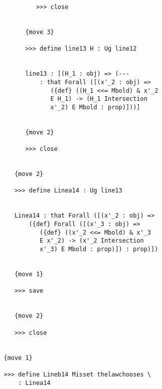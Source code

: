 \documentclass[12pt]{article}
\begin{document}
\begin{verbatim}
            >>> close


         {move 3}

         >>> define line13 H : Ug line12


         line13 : [(H_1 : obj) => (--- 
             : that Forall ([(x'_2 : obj) => 
                ({def} ((H_1 <<= Mbold) & x'_2 
                E H_1) -> (H_1 Intersection 
                x'_2) E Mbold : prop)]))]


         {move 2}

         >>> close


      {move 2}

      >>> define Linea14 : Ug line13


      Linea14 : that Forall ([(x'_2 : obj) => 
          ({def} Forall ([(x'_3 : obj) => 
             ({def} ((x'_2 <<= Mbold) & x'_3 
             E x'_2) -> (x'_2 Intersection 
             x'_3) E Mbold : prop)]) : prop)])


      {move 1}

      >>> save


      {move 2}

      >>> close


   {move 1}

   >>> define Lineb14 Misset thelawchooses \
       : Linea14



\end{verbatim}
\end{document}

